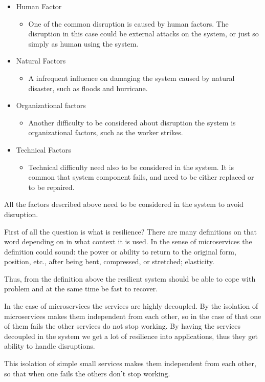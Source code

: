 \begin{itemize}
	\item Human Factor
	\begin{itemize}
		\item One of the common disruption is caused by human factors. The disruption in this case could be external attacks on the system, or just so simply as human using the system.  
	\end{itemize}
	\item Natural Factors
	\begin{itemize}
		\item A infrequent influence on damaging the system caused by natural disaster, such as floods and hurricane. 
	\end{itemize}
	\item Organizational factors
	\begin{itemize}
		\item Another difficulty to be considered about disruption the system is organizational factors, such as the worker strikes.   
	\end{itemize}
	\item Technical Factors
	\begin{itemize}
		\item Technical difficulty need also to be considered in the system. It is common that system component fails, and need to be either replaced or to be repaired.   
	\end{itemize}	
\end{itemize}

All the factors described above need to be considered in the system to avoid disruption. 

First of all the question is what is resilience? There are many definitions on that word depending on in what context it is used. In the sense of microservices the definition could sound: the power or ability to return to the original form, position, etc., after being bent, compressed, or stretched; elasticity.

Thus, from the definition above the resilient system should be able to cope with problem and at the same time be fast to recover. 

In the case of microservices the services are highly decoupled. By the isolation of microservices makes them independent from each other, so in the case of that one of them fails the other services do not stop working. By having the services decoupled in the system we get a lot of resilience into applications, thus they get ability to handle disruptions. 

   

This isolation of simple small services makes them independent from each other, so that when one fails the others don’t stop working.   

  





